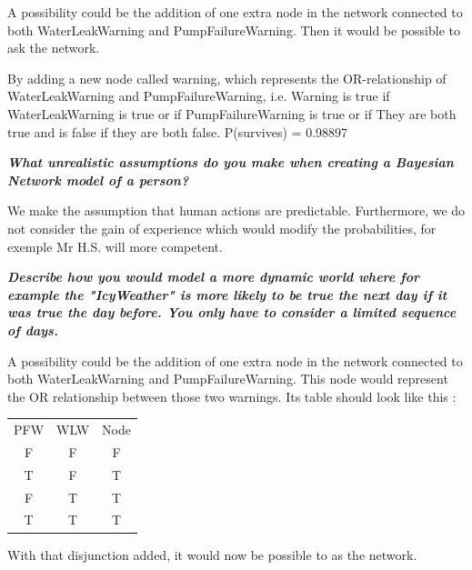 \vspace{1em}
A possibility could be the addition of one extra node in the network connected
to both WaterLeakWarning and PumpFailureWarning. Then it would be possible to
ask
the network.

  By adding a new node called warning, which represents the OR-relationship of
WaterLeakWarning and PumpFailureWarning, i.e. Warning is true if
WaterLeakWarning is true or if PumpFailureWarning is true or if They are both
true and is false if they are both false. P(survives) = 0.98897

\textit{\textbf{What unrealistic assumptions do you make when creating a
Bayesian Network model of a person?}}

\vspace{1em}
We make the assumption that human actions are predictable. Furthermore, we do
not
consider the gain of experience which would modify the probabilities, for
exemple
Mr H.S. will more competent.

\textit{\textbf{Describe how you would model a more dynamic world where for
 example the "IcyWeather" is more likely to be true the next day if it was
 true the day before. You only have to consider a limited sequence of days.}}

 \vspace{1em}

 A possibility could be the addition of one extra node in the network connected to both WaterLeakWarning and PumpFailureWarning. This node would represent the OR relationship between those two warnings.
 Its table should look like this :

\begin{centering}

  \begin{tabular}{ccc}

    PFW     &    WLW    &    Node  \\
    F       &         F        &        F \\
    T       &         F        &        T \\
    F       &         T        &       T \\
    T       &         T        &       T


  \end{tabular}

\end{centering}


 With that disjunction added, it would now be possible to as the network.

\thispagestyle{empty}

\newpage
\thispagestyle{empty}
